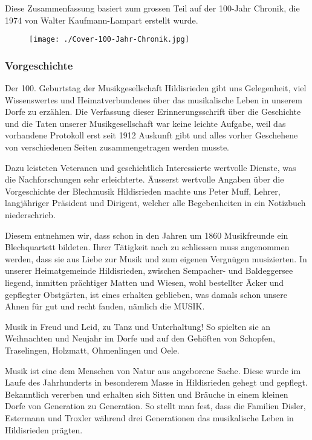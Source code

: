 Diese Zusammenfassung basiert zum grossen Teil auf der 100-Jahr Chronik, die 1974 von Walter Kaufmann-Lampart erstellt wurde.
\begin{figure}[ht]
    \texttt{[image: ./Cover-100-Jahr-Chronik.jpg]}
\end{figure}

\subsubsection*{Vorgeschichte}

\begin{history}

    Der 100. Geburtstag der Musikgesellschaft Hildisrieden gibt uns Gelegenheit,
    viel Wissenswertes und Heimatverbundenes über das musikalische Leben in
    unserem Dorfe zu erzählen. Die Verfassung dieser Erinnerungsschrift über die
    Geschichte und die Taten unserer Musikgesellschaft war keine leichte
    Aufgabe, weil das vorhandene Protokoll erst seit 1912 Auskunft gibt und
    alles vorher Geschehene von verschiedenen Seiten zusammengetragen werden
    musste.

    Dazu leisteten Veteranen und geschichtlich Interessierte wertvolle
    Dienste, was die Nachforschungen sehr erleichterte. Äusserst wertvolle
    Angaben über die Vorgeschichte der Blechmusik Hildisrieden machte uns Peter
    Muff, Lehrer, langjähriger Präsident und Dirigent, welcher alle
    Begebenheiten in ein Notizbuch niederschrieb.

    Diesem entnehmen wir, dass
    schon in den Jahren um 1860 Musikfreunde ein Blechquartett bildeten. Ihrer
    Tätigkeit nach zu schliessen muss angenommen werden, dass sie aus Liebe zur
    Musik und zum eigenen Vergnügen musizierten. In unserer Heimatgemeinde
    Hildisrieden, zwischen Sempacher- und Baldeggersee liegend, inmitten
    prächtiger Matten und Wiesen, wohl bestellter Äcker und gepflegter
    Obstgärten, ist eines erhalten geblieben, was damals schon unsere Ahnen für
    gut und recht fanden, nämlich die MUSIK.

    Musik in Freud und Leid, zu Tanz und Unterhaltung! So spielten sie an
    Weihnachten und Neujahr im Dorfe und auf den Gehöften von Schopfen,
    Traselingen, Holzmatt, Ohmenlingen und Oele.

    Musik ist eine dem Menschen von Natur aus angeborene Sache. Diese wurde im
    Laufe des Jahrhunderts in besonderem Masse in Hildisrieden gehegt und
    gepflegt. Bekanntlich vererben und erhalten sich Sitten und Bräuche in einem
    kleinen Dorfe von Generation zu Generation. So stellt man fest, dass die
    Familien Disler, Estermann und Troxler während drei Generationen das
    musikalische Leben in Hildisrieden prägten.

\end{history}
